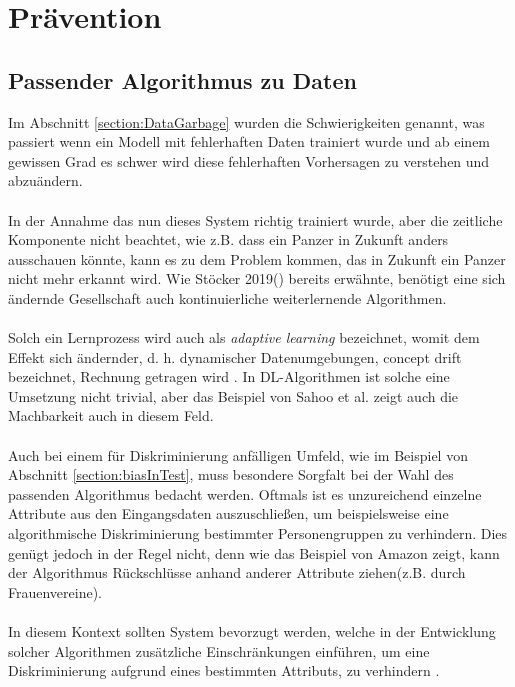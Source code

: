 \documentclass[12pt,oneside,a4paper,parskip]{scrbook}
\begin{document}
\chapter{Prävention}
\label{chapter:main}
\section{Passender Algorithmus zu Daten}

Im Abschnitt \ref{section:DataGarbage} wurden die Schwierigkeiten genannt, was passiert wenn ein Modell mit fehlerhaften Daten trainiert wurde und ab einem gewissen Grad es schwer wird diese fehlerhaften Vorhersagen zu verstehen und abzuändern.
\\\\
In der Annahme das nun dieses System richtig trainiert wurde, aber die zeitliche Komponente nicht beachtet, wie z.B. dass ein Panzer in Zukunft anders ausschauen könnte, kann es zu dem Problem kommen, das in Zukunft ein Panzer nicht mehr erkannt wird. Wie Stöcker 2019(\cite{stoecker}) bereits erwähnte, benötigt eine sich ändernde Gesellschaft auch kontinuierliche weiterlernende Algorithmen.
\\\\
Solch ein Lernprozess wird auch als \textit{adaptive learning} bezeichnet, womit dem Effekt sich ändernder, d. h. dynamischer Datenumgebungen, concept drift bezeichnet, Rechnung getragen wird \cite{gama}. In DL-Algorithmen ist solche eine Umsetzung nicht trivial, aber das Beispiel von Sahoo et al. \cite{sahoo} zeigt auch die Machbarkeit auch in diesem Feld.
\\\\
Auch bei einem für Diskriminierung anfälligen Umfeld, wie im Beispiel von Abschnitt \ref{section:biasInTest}, muss besondere Sorgfalt bei der Wahl des passenden Algorithmus bedacht werden. Oftmals ist es unzureichend einzelne Attribute aus den Eingangsdaten auszuschließen, um beispielsweise eine algorithmische Diskriminierung bestimmter Personengruppen zu verhindern. Dies genügt jedoch in der Regel nicht, denn wie das Beispiel von Amazon zeigt, kann der Algorithmus Rückschlüsse anhand anderer Attribute ziehen(z.B. durch Frauenvereine).
\\\\
In diesem Kontext sollten System bevorzugt werden, welche in der Entwicklung solcher Algorithmen zusätzliche Einschränkungen einführen, um eine Diskriminierung aufgrund eines bestimmten Attributs, zu verhindern \cite{kamiran}.
\end{document}
